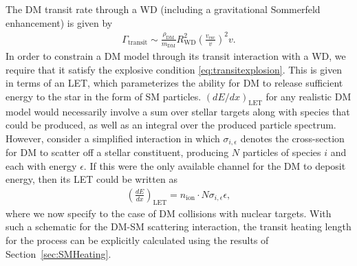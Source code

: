 \documentclass[twocolumn,showpacs,preprintnumbers,amsmath,amssymb,prd]{revtex4}
\def\r{\right)}
\def\l{\left(}
\begin{document}
The DM transit rate through a WD (including a gravitational Sommerfeld enhancement) is given by
\begin{align}
\Gamma_\text{transit} \sim \frac{\rho_{\text{DM}}}{m_\text{DM}} R_\text{WD}^2 \l\frac{v_\text{esc}}{v}\r^2 v.
\label{eq:TransitFluxCondition}
\end{align}
In order to constrain a DM model through its transit interaction with a WD, we require that it satisfy the explosive condition \eqref{eq:transitexplosion}. 
This is given in terms of an LET, which parameterizes the ability for DM to release sufficient energy to the star in the form of SM particles.
$(dE/dx)_\text{LET}$ for any realistic DM model would necessarily involve a sum over stellar targets along with species that could be produced, as well as an integral over the produced particle spectrum.
However, consider a simplified interaction in which $\sigma_{i,\epsilon}$ denotes the cross-section for DM to scatter off a stellar constituent, producing $N$ particles of species $i$ and each with energy $\epsilon$.
If this were the only available channel for the DM to deposit energy, then its LET could be written as
\begin{align}
\label{eq:schematicLET}
  \left( \frac{d E}{d x} \right)_\text{LET} = n_\text{ion} \cdot N \sigma_{i,\epsilon} \epsilon,
\end{align}
where we now specify to the case of DM collisions with nuclear targets. 
With such a schematic for the DM-SM scattering interaction, the transit heating length for the process can be explicitly calculated using the results of Section~\ref{sec:SMHeating}.
\end{document}
